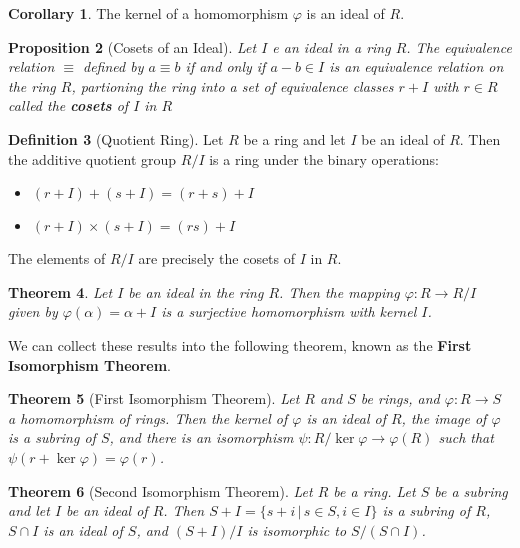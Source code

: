 \documentclass[10pt, oneside, reqno]{amsart}
\theoremstyle{plain}%
\newtheorem{thm}{Theorem}[section]
\newtheorem{prop}[thm]{Proposition}
\theoremstyle{definition}
\newtheorem{defn}[thm]{Definition}
\newtheorem{cor}[thm]{Corollary}
\theoremstyle{remark}
\newcommand{\al}{\alpha}
\begin{document}
\begin{cor}
	The kernel of a homomorphism $\varphi$ is an ideal of $R$.
\end{cor}

\begin{prop}[Cosets of an Ideal]
	Let $I$ e an ideal in a ring $R$.  The equivalence relation $\equiv$ defined by $a \equiv b$ if and only if $a - b \in I$ is an equivalence relation on the ring $R$, partioning the ring into a set of equivalence classes $r + I$ with $r \in R$ called the \textbf{cosets} of $I$ in $R$
\end{prop}

\begin{defn}[Quotient Ring]
	Let $R$ be a ring and let $I$ be an ideal of $R$.  Then the additive quotient group $R / I$ is a ring under the binary operations:
	\begin{itemize}
		\item $(r + I) + (s+I) = (r+s) + I$
		\item $(r + I) \times (s + I) = (rs) + I$
	\end{itemize}
	
	The elements of $R/I$ are precisely the cosets of $I$ in $R$.
\end{defn}

\begin{thm}
	Let $I$ be an ideal in the ring $R$.  Then the mapping $\varphi: R \rightarrow R/I$ given by $\varphi(\alpha) = \al + I$ is a surjective homomorphism with kernel $I$.
\end{thm}

We can collect these results into the following theorem, known as the \textbf{First Isomorphism Theorem}.

\begin{thm}[First Isomorphism Theorem]
	Let $R$ and $S$ be rings, and $\varphi: R \rightarrow S$ a homomorphism of rings.  Then the kernel of $\varphi$ is an ideal of $R$, the image of $\varphi$ is a subring of $S$, and there is an isomorphism $\psi: R / \ker \varphi \rightarrow \varphi(R)$ such that $\psi(r + \ker \varphi) = \varphi(r)$. 
\end{thm}


\begin{thm}[Second Isomorphism Theorem]
	Let $R$ be a ring. Let $S$ be a subring and let $I$ be an ideal of $R$.  Then $S + I = \{ s + i \, | \, s \in S, i \in I \}$ is a subring of $R$, $S \cap I$ is an ideal of $S$, and $(S + I)/I$ is isomorphic to $S/(S \cap I)$.
\end{thm}
\end{document}
